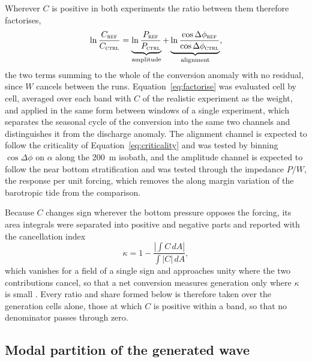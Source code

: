 \documentclass[a4paper,fleqn]{cas-sc}
\newcommand{\REF}{\textsc{ref}}
\newcommand{\CTRL}{\textsc{ctrl}}
\begin{document}
Wherever $C$ is positive in both experiments the ratio between them therefore factorises,
\begin{equation}
\ln\frac{C_{\REF}}{C_{\CTRL}}
=\underbrace{\ln\frac{P_{\REF}}{P_{\CTRL}}}_{\text{amplitude}}
+\underbrace{\ln\frac{\cos\Delta\phi_{\REF}}{\cos\Delta\phi_{\CTRL}}}_{\text{alignment}} ,
\label{eq:factorise}
\end{equation}
the two terms summing to the whole of the conversion anomaly with no residual, since $W$ cancels between the runs. Equation~\ref{eq:factorise} was evaluated cell by cell, averaged over each band with $C$ of the realistic experiment as the weight, and applied in the same form between windows of a single experiment, which separates the seasonal cycle of the conversion into the same two channels and distinguishes it from the discharge anomaly. The alignment channel is expected to follow the criticality of Equation~\ref{eq:criticality} and was tested by binning $\cos\Delta\phi$ on $\alpha$ along the 200~m isobath, and the amplitude channel is expected to follow the near bottom stratification and was tested through the impedance $P/W$, the response per unit forcing, which removes the along margin variation of the barotropic tide from the comparison.

Because $C$ changes sign wherever the bottom pressure opposes the forcing, its area integrals were separated into positive and negative parts and reported with the cancellation index
\begin{equation}
\kappa=1-\frac{\left|\int C\,dA\right|}{\int|C|\,dA} ,
\label{eq:kappa}
\end{equation}
which vanishes for a field of a single sign and approaches unity where the two contributions cancel, so that a net conversion measures generation only where $\kappa$ is small \citep{zilberman:2009,kurapov:2003}. Every ratio and share formed below is therefore taken over the generation cells alone, those at which $C$ is positive within a band, so that no denominator passes through zero.

\subsection{Modal partition of the generated wave}
\label{sec:modal}
\end{document}
